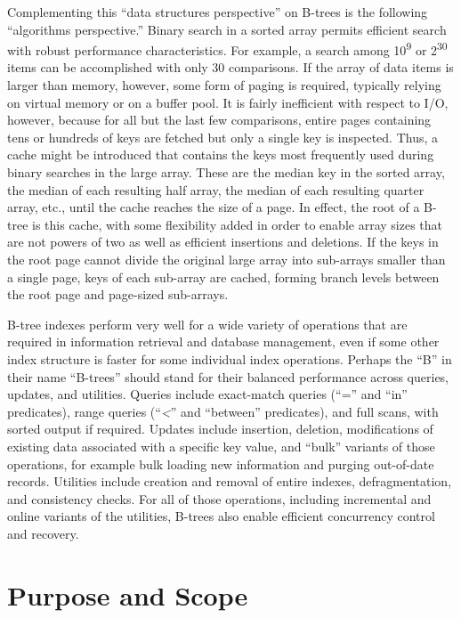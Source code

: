 Complementing this ``data structures perspective'' on B-trees is the
following ``algorithms perspective.'' Binary search in a sorted array
permits efficient search with robust performance characteristics. For
example, a search among 10\textsuperscript{9} or 2\textsuperscript{30}
items can be accomplished with only 30 comparisons. If the array of data
items is larger than memory, however, some form of paging is required,
typically relying on virtual memory or on a buffer pool. It is fairly
inefficient with respect to I/O, however, because for all but the last
few comparisons, entire pages containing tens or hundreds of keys are
fetched but only a single key is inspected. Thus, a cache might be
introduced that contains the keys most frequently used during binary
searches in the large array. These are the median key in the sorted
array, the median of each resulting half array, the median of each
resulting quarter array, etc., until the cache reaches the size of a
page. In effect, the root of a B-tree is this cache, with some
flexibility added in order to enable array sizes that are not powers of
two as well as efficient insertions and deletions. If the keys in the
root page cannot divide the original large array into sub-arrays smaller
than a single page, keys of each sub-array are cached, forming branch
levels between the root page and page-sized sub-arrays.

B-tree indexes perform very well for a wide variety of operations that
are required in information retrieval and database management, even if
some other index structure is faster for some individual index
operations. Perhaps the ``B'' in their name ``B-trees'' should stand for
their balanced performance across queries, updates, and utilities.
Queries include exact-match queries (``='' and ``in'' predicates), range
queries (``\emph{\textless{}}'' and ``between'' predicates), and full
scans, with sorted output if required. Updates include insertion,
deletion, modifications of existing data associated with a specific key
value, and ``bulk'' variants of those operations, for example bulk
loading new information and purging out-of-date records. Utilities
include creation and removal of entire indexes, defragmentation, and
consistency checks. For all of those operations, including incremental
and online variants of the utilities, B-trees also enable efficient
concurrency control and recovery.

\hypertarget{purpose-and-scope}{%
\section{Purpose and Scope}\label{purpose-and-scope}}

